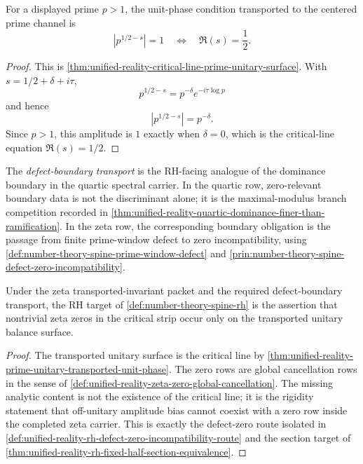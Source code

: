 \begin{theorem}
\label{thm:unified-reality-prime-unitary-transported-unit-phase}
For a displayed prime $p>1$, the unit-phase condition transported to
the centered prime channel is
$$
|p^{1/2-s}|=1
\quad\Longleftrightarrow\quad
\Re(s)=\frac12.
$$
\end{theorem}

\begin{proof}
This is
\autoref{thm:unified-reality-critical-line-prime-unitary-surface}. With
$s=1/2+\delta+i\tau$,
$$
p^{1/2-s}=p^{-\delta}e^{-i\tau\log p}
$$
and hence
$$
|p^{1/2-s}|=p^{-\delta}.
$$
Since $p>1$, this amplitude is $1$ exactly when $\delta=0$, which is the
critical-line equation $\Re(s)=1/2$.
\end{proof}

\begin{definition}
\label{def:unified-reality-defect-boundary-transport}
The \emph{defect-boundary transport} is the RH-facing analogue of the
dominance boundary in the quartic spectral carrier. In the quartic row,
zero-relevant boundary data is not the discriminant alone; it is the
maximal-modulus branch competition recorded in
\autoref{thm:unified-reality-quartic-dominance-finer-than-ramification}.
In the zeta row, the corresponding boundary obligation is the passage
from finite prime-window defect to zero incompatibility, using
\autoref{def:number-theory-spine-prime-window-defect} and
\autoref{prin:number-theory-spine-defect-zero-incompatibility}.
\end{definition}

\begin{theorem}
\label{thm:unified-reality-rh-transported-unitary-zero-rigidity}
Under the zeta transported-invariant packet and the required
defect-boundary transport, the RH target of
\autoref{def:number-theory-spine-rh} is the assertion that nontrivial
zeta zeros in the critical strip occur only on the transported unitary
balance surface.
\end{theorem}

\begin{proof}
The transported unitary surface is the critical line by
\autoref{thm:unified-reality-prime-unitary-transported-unit-phase}. The
zero rows are global cancellation rows in the sense of
\autoref{def:unified-reality-zeta-zero-global-cancellation}. The missing
analytic content is not the existence of the critical line; it is the
rigidity statement that off-unitary amplitude bias cannot coexist with a
zero row inside the completed zeta carrier. This is exactly the
defect-zero route isolated in
\autoref{def:unified-reality-rh-defect-zero-incompatibility-route} and
the section target of
\autoref{thm:unified-reality-rh-fixed-half-section-equivalence}.
\end{proof}


